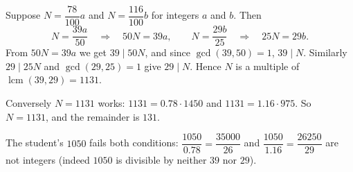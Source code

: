Suppose $N=\dfrac{78}{100}a$ and $N=\dfrac{116}{100}b$ for integers $a$ and $b$. Then
\[
N=\dfrac{39a}{50}\quad\Longrightarrow\quad 50N=39a,\qquad N=\dfrac{29b}{25}\quad\Longrightarrow\quad 25N=29b .
\]
From $50N=39a$ we get $39\mid50N$, and since $\gcd(39,50)=1$, $39\mid N$. Similarly $29\mid25N$ and $\gcd(29,25)=1$ give $29\mid N$. Hence $N$ is a multiple of $\operatorname{lcm}(39,29)=1131$.

Conversely $N=1131$ works: $1131=0.78\cdot1450$ and $1131=1.16\cdot975$. So $N=1131$, and the remainder is $\boxed{131}$.

The student's $1050$ fails both conditions: $\dfrac{1050}{0.78}=\dfrac{35000}{26}$ and $\dfrac{1050}{1.16}=\dfrac{26250}{29}$ are not integers (indeed $1050$ is divisible by neither $39$ nor $29$).
